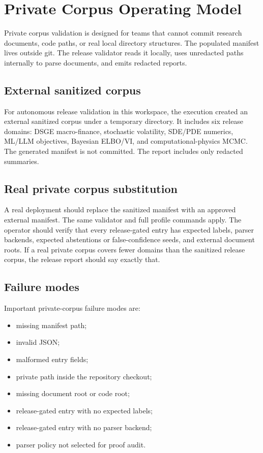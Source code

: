 \documentclass[12pt,a4paper,openany]{book}
\begin{document}
\chapter{Private Corpus Operating Model}

Private corpus validation is designed for teams that cannot commit research
documents, code paths, or real local directory structures. The populated
manifest lives outside git. The release validator reads it locally, uses
unredacted paths internally to parse documents, and emits redacted reports.

\section{External sanitized corpus}

For autonomous release validation in this workspace, the execution created an
external sanitized corpus under a temporary directory. It includes six release
domains: DSGE macro-finance, stochastic volatility, SDE/PDE numerics, ML/LLM
objectives, Bayesian ELBO/VI, and computational-physics MCMC. The generated
manifest is not committed. The report includes only redacted summaries.

\section{Real private corpus substitution}

A real deployment should replace the sanitized manifest with an approved
external manifest. The same validator and full profile commands apply. The
operator should verify that every release-gated entry has expected labels,
parser backends, expected abstentions or false-confidence seeds, and external
document roots. If a real private corpus covers fewer domains than the
sanitized release corpus, the release report should say exactly that.

\section{Failure modes}

Important private-corpus failure modes are:

\begin{itemize}
  \item missing manifest path;
  \item invalid JSON;
  \item malformed entry fields;
  \item private path inside the repository checkout;
  \item missing document root or code root;
  \item release-gated entry with no expected labels;
  \item release-gated entry with no parser backend;
  \item parser policy not selected for proof audit.
\end{itemize}
\end{document}
